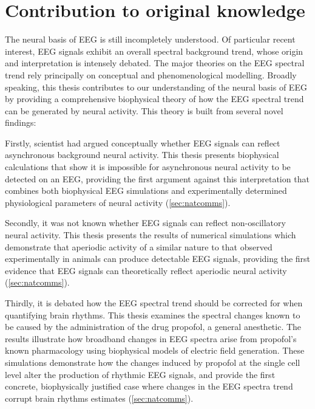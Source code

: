 \chapter*{Contribution to original knowledge}
\renewcommand{\chapterautorefname}{Chapter}

The neural basis of EEG is still incompletely understood. Of particular recent interest, EEG signals exhibit an overall spectral background trend, whose origin and interpretation is intensely debated. The major theories on the EEG spectral trend rely principally on conceptual and phenomenological modelling. Broadly speaking, this thesis contributes to our understanding of the neural basis of EEG by providing a comprehensive biophysical theory of how the EEG spectral trend can be generated by neural activity. This theory is built from several novel findings:

Firstly, scientist had argued conceptually whether EEG signals can reflect asynchronous background neural activity. This thesis presents biophysical calculations that show it is impossible for asynchronous neural activity to be detected on an EEG, providing the first argument against this interpretation that combines both biophysical EEG simulations and experimentally determined physiological parameters of neural activity (\autoref{sec:natcomms}). 

Secondly, it was not known whether EEG signals can reflect non-oscillatory neural activity. This thesis presents the results of numerical simulations which demonstrate that aperiodic activity of a similar nature to that observed experimentally in animals can produce detectable EEG signals, providing the first evidence that EEG signals can theoretically reflect aperiodic neural activity (\autoref{sec:natcomms}).

Thirdly, it is debated how the EEG spectral trend should be corrected for when quantifying brain rhythms. This thesis examines the spectral changes known to be caused by the administration of the drug propofol, a general anesthetic. The results illustrate how broadband changes in EEG spectra arise from propofol's known pharmacology using biophysical models of electric field generation. These simulations demonstrate how the changes induced by propofol at the single cell level alter the production of rhythmic EEG signals, and provide the first concrete, biophysically justified case where changes in the EEG spectra trend corrupt brain rhythms estimates (\autoref{sec:natcomms}).

